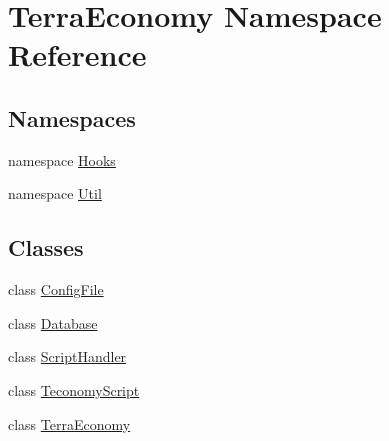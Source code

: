 \hypertarget{namespace_terra_economy}{}\section{Terra\+Economy Namespace Reference}
\label{namespace_terra_economy}
\subsection*{Namespaces}
\begin{DoxyCompactItemize}
\item 
namespace \hyperlink{namespace_terra_economy_1_1_hooks}{Hooks}
\item 
namespace \hyperlink{namespace_terra_economy_1_1_util}{Util}
\end{DoxyCompactItemize}
\subsection*{Classes}
\begin{DoxyCompactItemize}
\item 
class \hyperlink{class_terra_economy_1_1_config_file}{Config\+File}
\item 
class \hyperlink{class_terra_economy_1_1_database}{Database}
\item 
class \hyperlink{class_terra_economy_1_1_script_handler}{Script\+Handler}
\item 
class \hyperlink{class_terra_economy_1_1_teconomy_script}{Teconomy\+Script}
\item 
class \hyperlink{class_terra_economy_1_1_terra_economy}{Terra\+Economy}
\end{DoxyCompactItemize}

